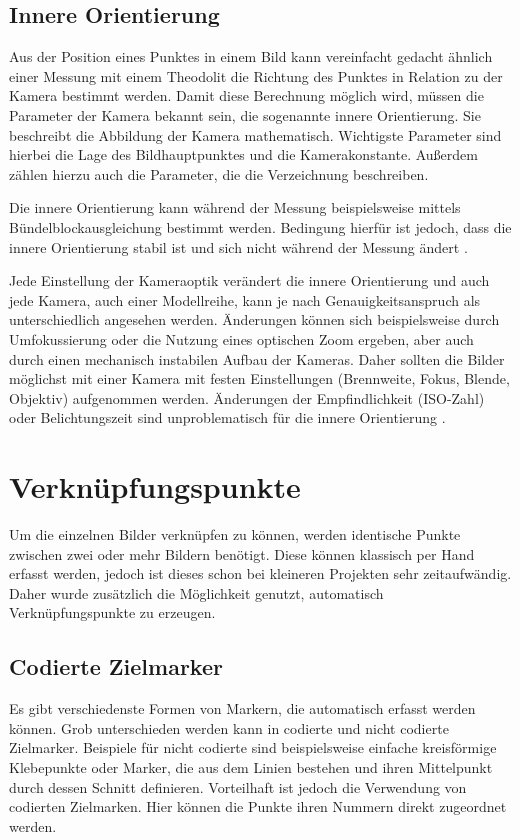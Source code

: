 \documentclass[./00PhotoBox.tex]{subfiles}
\begin{document}

\subsection{Innere Orientierung}
\label{s:innereorientierung}
Aus der Position eines Punktes in einem Bild kann vereinfacht gedacht ähnlich einer Messung mit einem Theodolit die Richtung des Punktes in Relation zu der Kamera bestimmt werden. Damit diese Berechnung möglich wird, müssen die Parameter der Kamera bekannt sein, die sogenannte innere Orientierung. Sie beschreibt die Abbildung der Kamera mathematisch. Wichtigste Parameter sind hierbei die Lage des Bildhauptpunktes und die Kamerakonstante. Außerdem zählen hierzu auch die Parameter, die die Verzeichnung beschreiben. \citep[S. 179f]{luhmann}

Die innere Orientierung kann während der Messung beispielsweise mittels Bündel\-block\-ausgleichung bestimmt werden. Bedingung hierfür ist jedoch, dass die innere Orientierung stabil ist und sich nicht während der Messung ändert \citep[S. 181f]{luhmann}.

Jede Einstellung der Kameraoptik verändert die innere Orientierung und auch jede Kamera, auch einer Modellreihe, kann je nach Genauigkeitsanspruch als unterschiedlich angesehen werden. Änderungen können sich beispielsweise durch Umfokussierung oder die Nutzung eines optischen Zoom ergeben, aber auch durch einen mechanisch instabilen Aufbau der Kameras. Daher sollten die Bilder möglichst mit einer Kamera mit festen Einstellungen (Brennweite, Fokus, Blende, Objektiv) aufgenommen werden. Änderungen der Empfindlichkeit (ISO-Zahl) oder Belichtungszeit sind unproblematisch für die innere Orientierung \citep[S. 176]{luhmann}.

\section{Verknüpfungspunkte}
\label{s:verknuepfung}
Um die einzelnen Bilder verknüpfen zu können, werden identische Punkte zwischen zwei oder mehr Bildern benötigt. Diese können klassisch per Hand erfasst werden, jedoch ist dieses schon bei kleineren Projekten sehr zeitaufwändig. Daher wurde zusätzlich die Möglichkeit genutzt, automatisch Verknüpfungspunkte zu erzeugen.

\subsection{Codierte Zielmarker}
Es gibt verschiedenste Formen von Markern, die automatisch erfasst werden können. Grob unterschieden werden kann in codierte und nicht codierte Zielmarker. Beispiele für nicht codierte sind beispielsweise einfache kreisförmige Klebepunkte oder Marker, die aus dem Linien bestehen und ihren Mittelpunkt durch dessen Schnitt definieren. 
Vorteilhaft ist jedoch die Verwendung von codierten Zielmarken. Hier können die Punkte ihren Nummern direkt zugeordnet werden. 
\citep[S.535ff]{luhmann}
\end{document}
